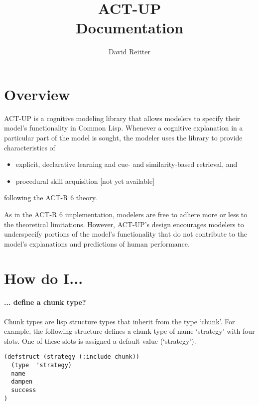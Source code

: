 \documentclass{article}
\begin{document}
\title{ACT-UP \\
Documentation}

\author{David Reitter}

\maketitle




\section{Overview}


ACT-UP is a cognitive modeling library that allows modelers to specify their model's functionality in Common Lisp.  Whenever a cognitive explanation in a particular part of the model is sought, the modeler uses the library to provide characteristics of 

\begin{itemize}\item  explicit, declarative learning and cue- and similarity-based
  retrieval, and \item procedural skill acquisition [not yet available]
\end{itemize}
following the ACT-R 6 theory.

As in the ACT-R 6 implementation, modelers are free to adhere more or less to the theoretical limitations.  However, ACT-UP's design encourages modelers to underspecify portions of the model's functionality that do not contribute to the model's explanations and predictions of human performance.  




\section{How do I...}


\paragraph {... define a chunk type?}

Chunk types are lisp structure types that inherit from the type `chunk'.
For example, the following structure defines a chunk type of name `strategy' with four slots.
One of these slots is assigned a default value (`strategy').

\begin{verbatim}
(defstruct (strategy (:include chunk))
  (type  'strategy)
  name
  dampen
  success
)
\end{verbatim}
\end{document}

